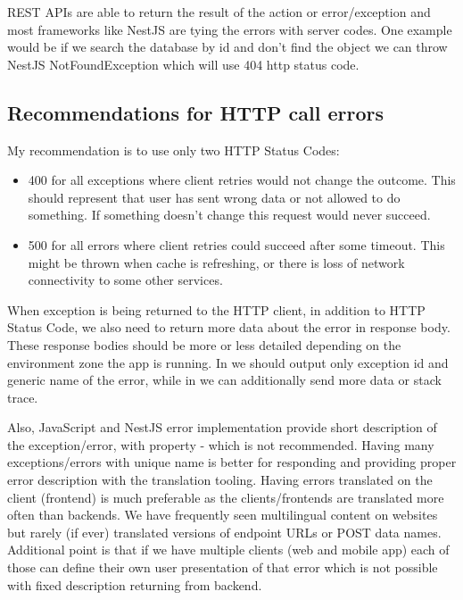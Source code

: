     REST APIs are able to return the result of the action or error/exception
    and most frameworks like NestJS are tying the errors with server codes.
    One example would be if we search the database by id and don't find the
    object we can throw NestJS NotFoundException which will use 404 http status code.

    \subsection{Recommendations for HTTP call errors}\label{subsec:recommendations-for-http-call-errors}

    My recommendation is to use only two HTTP Status Codes:
    \begin{itemize}
        \item 400 for all exceptions where client retries would not change the outcome.
        This should represent that user has sent wrong data or not allowed to do something.
        If something doesn't change this request would never succeed.
        \item 500 for all errors where client retries could succeed after some timeout.
        This might be thrown when cache is refreshing, or there is loss of network connectivity
        to some other services.
    \end{itemize}

    When exception is being returned to the HTTP client, in addition to HTTP Status Code,
    we also need to return more data about the error in response body.
    These response bodies should be more or less detailed depending on the environment zone the app is running.
    In  we should output only exception id and generic name of the error,
    while in  we can additionally send more data or stack trace.

    Also, JavaScript and NestJS error implementation provide short description of the exception/error,
    with  property - which is not recommended.
    Having many exceptions/errors with unique name is better for responding and providing proper error description with
    the translation tooling.
    Having errors translated on the client (frontend) is much preferable as the clients/frontends are translated more often than backends.
    We have frequently seen
    multilingual content on websites but rarely (if ever) translated versions of endpoint URLs or
    POST data names.
    Additional point is that if we have multiple clients (web and mobile app)
    each of those can define their own user presentation of that error which is not possible
    with fixed description returning from backend.

